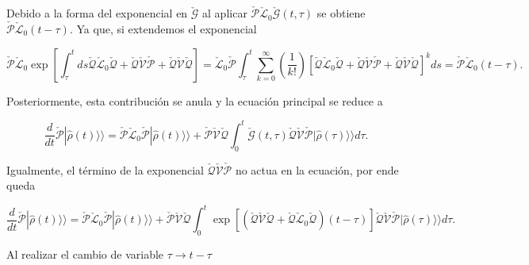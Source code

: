 \begin{appendixs}
Debido a la forma del exponencial en $\check{\mathcal{G}}$ al aplicar $\check{\mathcal{P}}\check{\mathcal{L}}_{0}\check{\mathcal{G}}(t,\tau)$ se obtiene $\check{\mathcal{P}}\check{\mathcal{L}}_{0}(t-\tau)$. Ya que, si extendemos el exponencial

\begin{equation*}
    \check{\mathcal{P}}\check{\mathcal{L}}_{0}\exp\left[\int_{\tau}^{t}ds\check{\mathcal{Q}}\check{\mathcal{L}}_{0}\check{\mathcal{Q}}+ \check{\mathcal{Q}}\check{\mathcal{V}}\check{\mathcal{P}}+\check{\mathcal{Q}}\check{\mathcal{V}}\check{\mathcal{Q}} \right] = \check{\mathcal{L}}_{0}\check{\mathcal{P}}\int_{\tau}^{t}\sum_{k=0}^{\infty}\left(\frac{1}{k!} \right)\left[\check{\mathcal{Q}}\check{\mathcal{L}}_{0}\check{\mathcal{Q}}+ \check{\mathcal{Q}}\check{\mathcal{V}}\check{\mathcal{P}}+\check{\mathcal{Q}}\check{\mathcal{V}}\check{\mathcal{Q}} \right]^{k}ds = \check{\mathcal{P}}\check{\mathcal{L}}_{0}(t-\tau).
\end{equation*}

Posteriormente, esta contribución se anula y la ecuación principal se reduce a

\begin{equation*}
    \frac{d}{dt}\check{\mathcal{P}}|\hat{\rho}(t)\rangle \rangle = \check{\mathcal{P}}\check{\mathcal{L}}_{0}\check{\mathcal{P}}|\hat{\rho}(t)\rangle \rangle + \check{\mathcal{P}}\check{\mathcal{V}}\check{\mathcal{Q}}\int_{0}^{t}\check{\mathcal{G}}(t,\tau)\check{\mathcal{Q}}\check{\mathcal{V}} \check{\mathcal{P}}|\hat{\rho}(\tau)\rangle \rangle d\tau.        
\end{equation*}

Igualmente, el término de la exponencial $\check{\mathcal{Q}}\check{\mathcal{V}}\check{\mathcal{P}}$ no actua en la ecuación, por ende queda  

\begin{equation*}
    \frac{d}{dt}\check{\mathcal{P}}|\hat{\rho}(t)\rangle \rangle  = \check{\mathcal{P}}\check{\mathcal{L}}_{0}\check{\mathcal{P}}|\hat{\rho}(t)\rangle \rangle  + \check{\mathcal{P}}\check{\mathcal{V}}\check{\mathcal{Q}}\int_{0}^{t}\exp \left[\left(\check{\mathcal{Q}}\check{\mathcal{V}}\check{\mathcal{Q}} + \check{\mathcal{Q}}\check{\mathcal{L}}_{0}\check{\mathcal{Q}}\right) (t-\tau) \right]\check{\mathcal{Q}}\check{\mathcal{V}} \check{\mathcal{P}}|\hat{\rho}(\tau)\rangle \rangle d\tau.        
\end{equation*}

Al realizar el cambio de variable $\tau \to t-\tau$


\end{appendixs}
